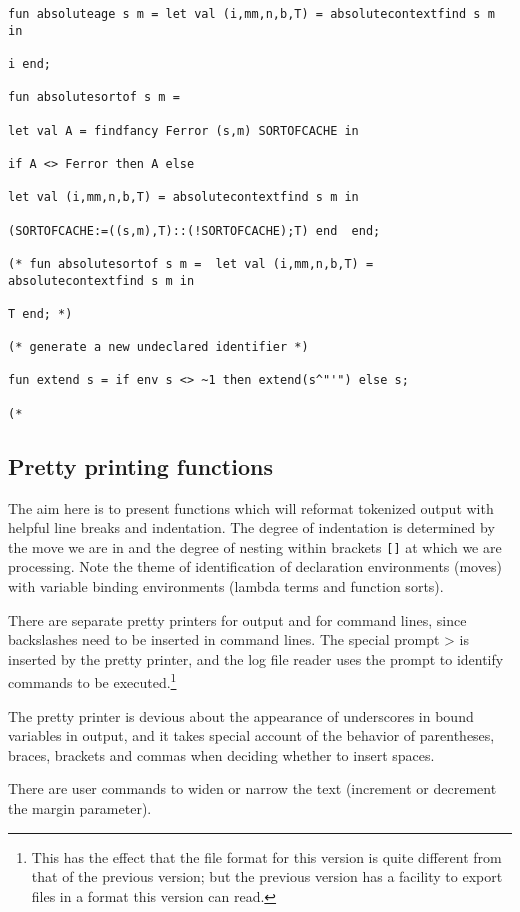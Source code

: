 \documentclass[12pt]{article}
\begin{document}
\begin{verbatim}
fun absoluteage s m = let val (i,mm,n,b,T) = absolutecontextfind s m in

i end;

fun absolutesortof s m =  

let val A = findfancy Ferror (s,m) SORTOFCACHE in

if A <> Ferror then A else 

let val (i,mm,n,b,T) = absolutecontextfind s m in

(SORTOFCACHE:=((s,m),T)::(!SORTOFCACHE);T) end  end;

(* fun absolutesortof s m =  let val (i,mm,n,b,T) = absolutecontextfind s m in

T end; *)

(* generate a new undeclared identifier *)

fun extend s = if env s <> ~1 then extend(s^"'") else s;

(*

\end{verbatim}

\newpage

\subsection{Pretty printing functions}

The aim here is to present functions which will reformat tokenized output with helpful line
breaks and indentation.  The degree of indentation is determined by the move we are in and
the degree of nesting within brackets \verb|[]| at which we are processing.  Note the theme of identification of declaration environments (moves) with variable binding environments (lambda terms and function sorts).

There are separate pretty printers for output and for command lines, since backslashes need to be inserted in command lines.
The special prompt \verb >>>  is inserted by the pretty printer, and the log file reader uses the prompt to identify commands to be executed.\footnote{This has the effect that the file format for this version is quite different from that of the previous version;  but the previous version has a facility to export files in a format this version can read.}

The pretty printer is devious about the appearance of underscores in bound variables in output, and it takes special account of the behavior of parentheses,
braces, brackets and commas when deciding whether to insert spaces.

There are user commands to widen or narrow the text (increment or decrement the margin parameter).
\end{document}
